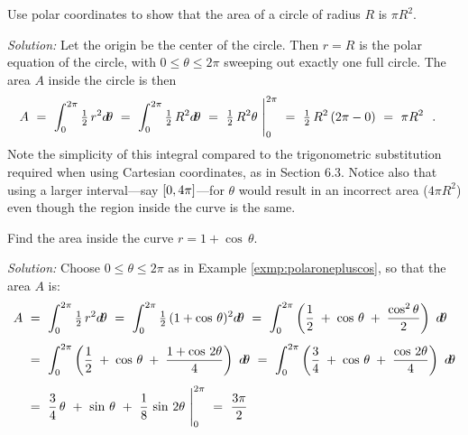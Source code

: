 \newpage
\begin{exmp}
\noindent Use polar coordinates to show that the area of a circle of radius $R$
is $\pi R^2$.\vspace{1mm}
\par\noindent\emph{Solution:} Let the origin be the center of the circle. Then
$r=R$ is the polar equation of the circle, with $0 \le \theta \le 2\pi$ sweeping
out exactly one full circle. The area $A$ inside the circle is then
\[
A ~=~ \int_{0}^{2\pi} \tfrac{1}{2}\,r^2 d\!\theta ~=~
\int_{0}^{2\pi} \tfrac{1}{2}\,R^2 d\!\theta ~=~
\tfrac{1}{2}\,R^2 \theta~\Biggr|_0^{2\pi} ~=~ \tfrac{1}{2}\,R^2\,(2\pi - 0) ~=~
\pi R^2 ~~.\quad\relax
\]
Note the simplicity of this integral compared to the trigonometric substitution
required when using Cartesian coordinates, as in Section 6.3. Notice also that
using a larger interval---say $\lbrack 0,4\pi \rbrack$---for $\theta$ would result in an
incorrect area ($4\pi R^2$) even though the region inside the curve is the same.
\end{exmp}
\begin{exmp}
\noindent Find the area inside the curve $r = 1 + \cos\,\theta$.\vspace{1mm}
\par\noindent\emph{Solution:} Choose $0 \le \theta \le 2\pi$ as in Example
\ref{exmp:polaronepluscos}, so that the area
$A$ is:
\begin{align*}
A ~&=~ \int_{0}^{2\pi} \tfrac{1}{2}\,r^2 d\!\theta ~=~
\int_{0}^{2\pi} \tfrac{1}{2}\,(1 + \cos\,\theta)^2 d\!\theta
~=~ \int_{0}^{2\pi} \left(\frac{1}{2} \;+\; \cos\,\theta \;+\;
    \frac{\cos^2 \theta}{2} \right)~d\!\theta\\[4pt]
&=~ \int_{0}^{2\pi} \left(\frac{1}{2} \;+\; \cos\,\theta \;+\;
    \frac{1 + \cos\,2\theta}{4} \right)~d\!\theta
~=~ \int_{0}^{2\pi} \left(\frac{3}{4} \;+\; \cos\,\theta \;+\;
    \frac{\cos\,2\theta}{4} \right)~d\!\theta\\[4pt]
&=~ \frac{3}{4}\,\theta ~+~ \sin\,\theta ~+~ \frac{1}{8}\,\sin\,2\theta~\Biggr|_0^{2\pi} ~=~
\frac{3\pi}{2}
\end{align*}
\end{exmp}
\divider

